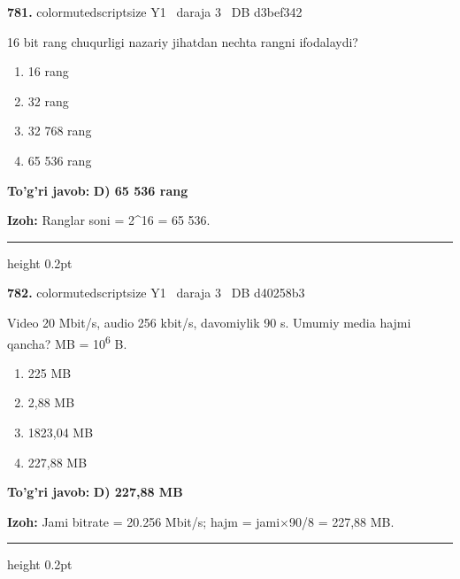 \documentclass[10pt,a4paper,oneside]{article}
\begin{document}
\noindent\textbf{\color{ink}781.}  {color{muted}scriptsize Y1 \textbullet\ daraja 3 \textbullet\ DB d3bef342}
\par
16 bit rang chuqurligi nazariy jihatdan nechta rangni ifodalaydi?
\begin{enumerate}[label=\Alph*),leftmargin=9mm]
\item 16 rang
\item 32 rang
\item 32 768 rang
\item 65 536 rang
\end{enumerate}
\begin{tcolorbox}[enhanced,breakable,colback=teal!4,colframe=teal!50!black,boxrule=0.5pt,arc=1.1mm,left=3mm,right=3mm,top=1.7mm,bottom=1.7mm,before skip=2mm,after skip=2mm]
\textbf{\color{teal}To'g'ri javob:} \textbf{D) 65 536 rang}
\par\smallskip
\textbf{Izoh:} Ranglar soni = 2\textasciicircum{}16 = 65 536.
\end{tcolorbox}
\vspace{2mm}\hrule height 0.2pt \vspace{3mm}

\noindent\textbf{\color{ink}782.}  {color{muted}scriptsize Y1 \textbullet\ daraja 3 \textbullet\ DB d40258b3}
\par
Video 20 Mbit/s, audio 256 kbit/s, davomiylik 90 s. Umumiy media hajmi qancha? MB = 10\textsuperscript{6} B.
\begin{enumerate}[label=\Alph*),leftmargin=9mm]
\item 225 MB
\item 2,88 MB
\item 1823,04 MB
\item 227,88 MB
\end{enumerate}
\begin{tcolorbox}[enhanced,breakable,colback=teal!4,colframe=teal!50!black,boxrule=0.5pt,arc=1.1mm,left=3mm,right=3mm,top=1.7mm,bottom=1.7mm,before skip=2mm,after skip=2mm]
\textbf{\color{teal}To'g'ri javob:} \textbf{D) 227,88 MB}
\par\smallskip
\textbf{Izoh:} Jami bitrate = 20.256 Mbit/s; hajm = jami\ensuremath{\times}90/8 = 227,88 MB.
\end{tcolorbox}
\vspace{2mm}\hrule height 0.2pt \vspace{3mm}
\end{document}
